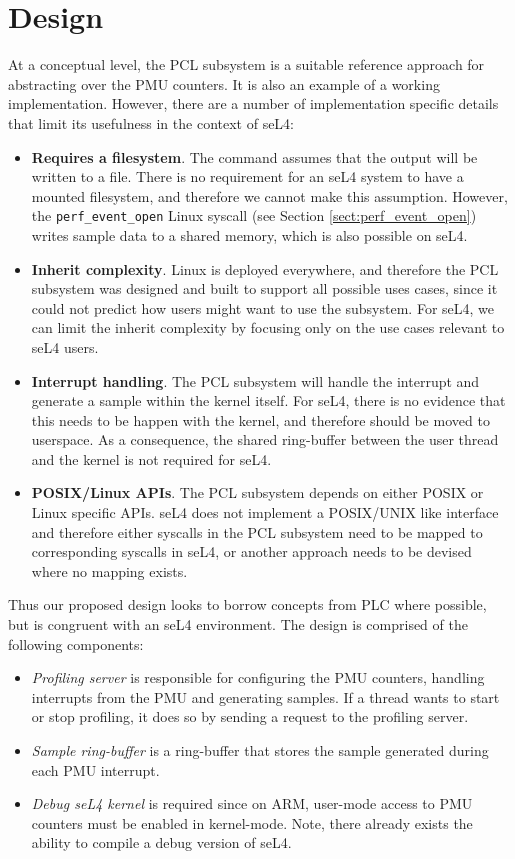 \section{Design}

At a conceptual level, the PCL subsystem is a suitable reference approach for abstracting over the PMU counters. It is also an example of a working implementation. However, there are a number of implementation specific details that limit its usefulness in the context of seL4:

\ssp\begin{itemize}
    \item \textbf{Requires a filesystem}. The  command assumes that the output will be written to a file. There is no requirement for an seL4 system to have a mounted filesystem, and therefore we cannot make this assumption. However, the \texttt{perf\_event\_open} Linux syscall (see Section \ref{sect:perf_event_open}) writes sample data to a shared memory, which is also possible on seL4.
    \item \textbf{Inherit complexity}. Linux is deployed everywhere, and therefore the PCL subsystem was designed and built to support all possible uses cases, since it could not predict how users might want to use the subsystem. For seL4, we can limit the inherit complexity by focusing only on the use cases relevant to seL4 users.
    \item \textbf{Interrupt handling}. The PCL subsystem will handle the interrupt and generate a sample within the kernel itself. For seL4, there is no evidence that this needs to be happen with the kernel, and therefore should be moved to userspace. As a consequence, the shared ring-buffer between the user thread and the kernel is not required for seL4.
    \item \textbf{POSIX/Linux APIs}. The PCL subsystem depends on either POSIX or Linux specific APIs. seL4 does not implement a POSIX/UNIX like interface and therefore either syscalls in the PCL subsystem need to be mapped to corresponding syscalls in seL4, or another approach needs to be devised where no mapping exists.
\end{itemize}\dsp

Thus our proposed design looks to borrow concepts from PLC where possible, but is congruent with an seL4 environment. The design is comprised of the following components:

\ssp\begin{itemize}
    \item \textit{Profiling server} is responsible for configuring the PMU counters, handling interrupts from the PMU and generating samples. If a thread wants to start or stop profiling, it does so by sending a request to the profiling server.
    \item \textit{Sample ring-buffer} is a ring-buffer that stores the sample generated during each PMU interrupt.
    \item \textit{Debug seL4 kernel} is required since on ARM, user-mode access to PMU counters must be enabled in kernel-mode. Note, there already exists the ability to compile a debug version of seL4.
\end{itemize}\dsp

